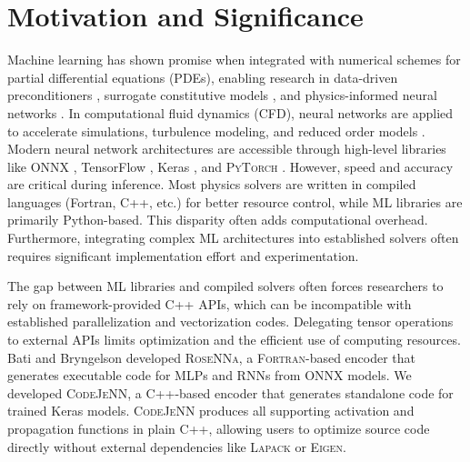 \documentclass[preprint,12pt, a4paper]{elsarticle}
\begin{document}
\let\svthefootnote\thefootnote\let\thefootnote\relax{}\addtocounter{footnote}{-1}\let\thefootnote\svthefootnote

\section{Motivation and Significance}
Machine learning has shown promise when integrated with numerical schemes for partial differential equations (PDEs), enabling research in data-driven preconditioners \cite{hausner_learning_2024, li_learning_2023}, surrogate constitutive models \cite{fuhg_review_2025}, and physics-informed neural networks \cite{raissi_physics-informed_2019, zhao_comprehensive_2024, cai_physics-informed_2021}. In computational fluid dynamics (CFD), neural networks are applied to accelerate simulations, turbulence modeling, and reduced order models \cite{vinuesa_enhancing_2022}. Modern neural network architectures are accessible through high-level libraries like \textsc{ONNX} \cite{bai_onnx_2019}, TensorFlow \cite{martin_abadi_tensorflow_2015}, Keras \cite{chollet_keras_2015}, and \textsc{PyTorch} \cite{ansel_pytorch_2024}. However, speed and accuracy are critical during inference. Most physics solvers are written in compiled languages (Fortran, C++, etc.) for better resource control, while ML libraries are primarily Python-based. This disparity often adds computational overhead. Furthermore, integrating complex ML architectures into established solvers often requires significant implementation effort and experimentation.

The gap between ML libraries and compiled solvers often forces researchers to rely on framework-provided C++ APIs, which can be incompatible with established parallelization and vectorization codes. Delegating tensor operations to external APIs limits optimization and the efficient use of computing resources. Bati and Bryngelson \cite{bati_rosenna_2024} developed \textsc{RoseNNa}, a \textsc{Fortran}-based encoder that generates executable code for MLPs and RNNs from \textsc{ONNX} models. We developed \textsc{CodeJeNN}, a C++-based encoder that generates standalone code for trained Keras models. \textsc{CodeJeNN} produces all supporting activation and propagation functions in plain C++, allowing users to optimize source code directly without external dependencies like \textsc{Lapack} or \textsc{Eigen}. 
\end{document}
